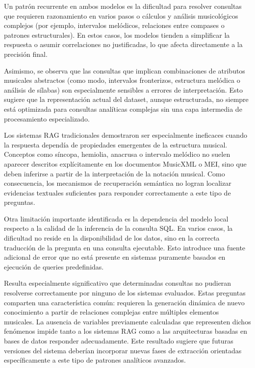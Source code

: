 Un patrón recurrente en ambos modelos es la dificultad para resolver consultas que requieren razonamiento en varios pasos o cálculos y análisis musicológicos complejos (por ejemplo, intervalos melódicos, relaciones entre compases o patrones estructurales). En estos casos, los modelos tienden a simplificar la respuesta o asumir correlaciones no justificadas, lo que afecta directamente a la precisión final.

Asimismo, se observa que las consultas que implican combinaciones de atributos musicales abstractos (como modo, intervalos fronterizos, estructura melódica o análisis de sílabas) son especialmente sensibles a errores de interpretación. Esto sugiere que la representación actual del dataset, aunque estructurada, no siempre está optimizada para consultas analíticas complejas sin una capa intermedia de procesamiento especializado.

Los sistemas RAG tradicionales demostraron ser especialmente ineficaces cuando la respuesta dependía de propiedades emergentes de la estructura musical. Conceptos como síncopa, hemiolia, anacrusa o intervalo melódico no suelen aparecer descritos explícitamente en los documentos MusicXML o MEI, sino que deben inferirse a partir de la interpretación de la notación musical. Como consecuencia, los mecanismos de recuperación semántica no logran localizar evidencias textuales suficientes para responder correctamente a este tipo de preguntas.

Otra limitación importante identificada es la dependencia del modelo local respecto a la calidad de la inferencia de la consulta SQL. En varios casos, la dificultad no reside en la disponibilidad de los datos, sino en la correcta traducción de la pregunta en una consulta ejecutable. Esto introduce una fuente adicional de error que no está presente en sistemas puramente basados en ejecución de queries predefinidas.

Resulta especialmente significativo que determinadas consultas no pudieran resolverse correctamente por ninguno de los sistemas evaluados. Estas preguntas comparten una característica común: requieren la generación dinámica de nuevo conocimiento a partir de relaciones complejas entre múltiples elementos musicales. La ausencia de variables previamente calculadas que representen dichos fenómenos impide tanto a los sistemas RAG como a las arquitecturas basadas en bases de datos responder adecuadamente. Este resultado sugiere que futuras versiones del sistema deberían incorporar nuevas fases de extracción orientadas específicamente a este tipo de patrones analíticos avanzados.

